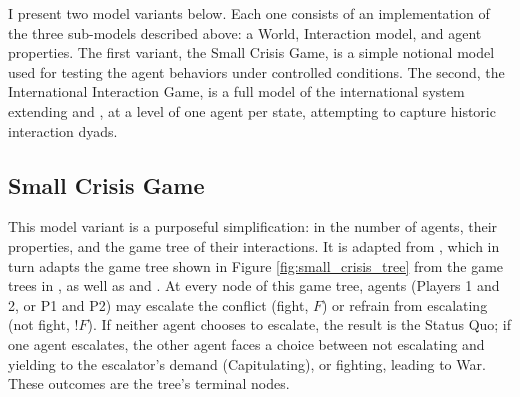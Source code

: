 I present two model variants below. Each one consists of an implementation of the three sub-models described above: a World, Interaction model, and agent properties. The first variant, the Small Crisis Game, is a simple notional model used for testing the agent behaviors under controlled conditions. The second, the International Interaction Game, is a full model of the international system extending \citet{bdm_1992} and \citet{bennett_2000b}, at a level of one agent per state, attempting to capture historic interaction dyads.

\subsection{Small Crisis Game} \label{small_crisis}

This model variant is a purposeful simplification: in the number of agents, their properties, and the game tree of their interactions. It is adapted from \citet{signorino_1999}, which in turn adapts the game tree shown in Figure \ref{fig:small_crisis_tree} from the game trees in \citet{bdm_1992}, as well as \citet{kim_1995} and \citet{fearon_1995}. At every node of this game tree, agents (Players 1 and 2, or P1 and P2) may escalate the conflict (fight, $F$) or refrain from escalating (not fight, $!F$). If neither agent chooses to escalate, the result is the Status Quo; if one agent escalates, the other agent faces a choice between not escalating and yielding to the escalator's demand (Capitulating), or fighting, leading to War. These outcomes are the tree's terminal nodes.

